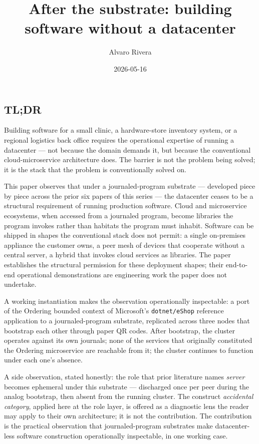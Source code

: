 \documentclass[
]{article}
\title{After the substrate: building software without a datacenter}
\author{Alvaro Rivera}
\date{2026-05-16}
\newcounter{none} %
\begin{document}
\maketitle

\subsection{TL;DR}\label{tldr}

Building software for a small clinic, a hardware-store inventory system,
or a regional logistics back office requires the operational expertise
of running a datacenter --- not because the domain demands it, but
because the conventional cloud-microservice architecture does. The
barrier is not the problem being solved; it is the stack that the
problem is conventionally solved on.

This paper observes that under a journaled-program substrate ---
developed piece by piece across the prior six papers of this series ---
the datacenter ceases to be a structural requirement of running
production software. Cloud and microservice ecosystems, when accessed
from a journaled program, become libraries the program invokes rather
than habitats the program must inhabit. Software can be shipped in
shapes the conventional stack does not permit: a single on-premises
appliance the customer owns, a peer mesh of devices that cooperate
without a central server, a hybrid that invokes cloud services as
libraries. The paper establishes the structural permission for these
deployment shapes; their end-to-end operational demonstrations are
engineering work the paper does not undertake.

A working instantiation makes the observation operationally inspectable:
a port of the Ordering bounded context of Microsoft's
\texttt{dotnet/eShop} reference application to a journaled-program
substrate, replicated across three nodes that bootstrap each other
through paper QR codes. After bootstrap, the cluster operates against
its own journals; none of the services that originally constituted the
Ordering microservice are reachable from it; the cluster continues to
function under each one's absence.

A side observation, stated honestly: the role that prior literature
names \emph{server} becomes ephemeral under this substrate ---
discharged once per peer during the analog bootstrap, then absent from
the running cluster. The construct \emph{accidental category}, applied
here at the role layer, is offered as a diagnostic lens the reader may
apply to their own architecture; it is not the contribution. The
contribution is the practical observation that journaled-program
substrates make datacenter-less software construction operationally
inspectable, in one working case.
\end{document}
